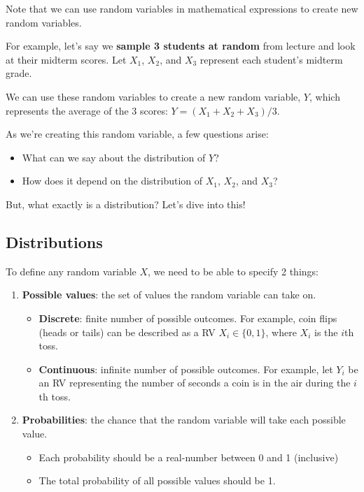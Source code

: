 \documentclass[
  letterpaper,
  DIV=11,
  numbers=noendperiod]{scrreprt}
\providecommand{\tightlist}{%
  \setlength{\itemsep}{0pt}\setlength{\parskip}{0pt}}\usepackage{longtable,booktabs,array}
\begin{document}
Note that we can use random variables in mathematical expressions to
create new random variables.

For example, let's say we \textbf{sample 3 students at random} from
lecture and look at their midterm scores. Let \(X_1\), \(X_2\), and
\(X_3\) represent each student's midterm grade.

We can use these random variables to create a new random variable,
\(Y\), which represents the average of the 3 scores:
\(Y = (X_1 + X_2 + X_3)/3\).

As we're creating this random variable, a few questions arise:

\begin{itemize}
\tightlist
\item
  What can we say about the distribution of \(Y\)?
\item
  How does it depend on the distribution of \(X_1\), \(X_2\), and
  \(X_3\)?
\end{itemize}

But, what exactly is a distribution? Let's dive into this!

\subsection{Distributions}\label{distributions}

To define any random variable \(X\), we need to be able to specify 2
things:

\begin{enumerate}
\def\labelenumi{\arabic{enumi}.}
\item
  \textbf{Possible values}: the set of values the random variable can
  take on.

  \begin{itemize}
  \tightlist
  \item
    \textbf{Discrete}: finite number of possible outcomes. For example,
    coin flips (heads or tails) can be described as a RV
    \(X_i \in \{0, 1\}\), where \(X_i\) is the \(i\)th toss.
  \item
    \textbf{Continuous}: infinite number of possible outcomes. For
    example, let \(Y_i\) be an RV representing the number of seconds a
    coin is in the air during the \(i\)th toss.
  \end{itemize}
\item
  \textbf{Probabilities}: the chance that the random variable will take
  each possible value.

  \begin{itemize}
  \tightlist
  \item
    Each probability should be a real-number between 0 and 1 (inclusive)
  \item
    The total probability of all possible values should be 1.
  \end{itemize}
\end{enumerate}
\end{document}
